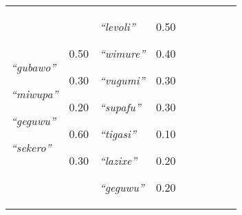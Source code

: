 {\begin{tabular}{@{}p{1.2cm}|p{1.6cm}@{}p{0.8cm}@{}|p{1.6cm}@{}p{0.8cm}@{}|p{1.6cm}@{}p{0.8cm}@{}|p{1.6cm}@{}p{0.8cm}@{}}
\textit{``gubawo''}


\textit{``miwupa''}


\textit{``geguwu''}


\textit{``sekero''}
&0.50

0.30

0.20

0.60

0.30&\textit{``levoli''}


\textit{``wimure''}


\textit{``vugumi''}


\textit{``supafu''}


\textit{``tigasi''}


\textit{``lazixe''}


\textit{``geguwu''}
&0.50

0.40

0.30

0.30

0.10

0.20

0.20\\
\end{tabular}}

